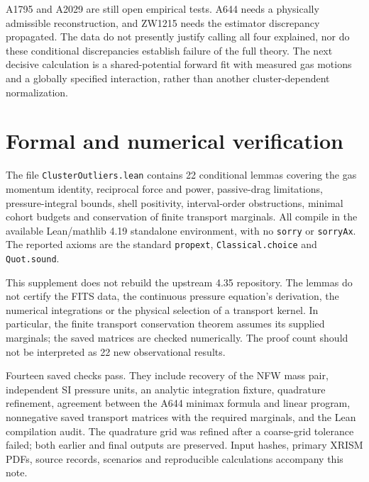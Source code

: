 \documentclass[11pt]{article}
\begin{document}
A1795 and A2029 are still open empirical tests. A644 needs a physically admissible reconstruction, and ZW1215 needs the estimator discrepancy propagated. The data do not presently justify calling all four explained, nor do these conditional discrepancies establish failure of the full theory. The next decisive calculation is a shared-potential forward fit with measured gas motions and a globally specified interaction, rather than another cluster-dependent normalization.

\clearpage
\section{Formal and numerical verification}
The file \texttt{ClusterOutliers.lean} contains 22 conditional lemmas covering the gas momentum identity, reciprocal force and power, passive-drag limitations, pressure-integral bounds, shell positivity, interval-order obstructions, minimal cohort budgets and conservation of finite transport marginals. All compile in the available Lean/mathlib 4.19 standalone environment, with no \texttt{sorry} or \texttt{sorryAx}. The reported axioms are the standard \texttt{propext}, \texttt{Classical.choice} and \texttt{Quot.sound}.

This supplement does not rebuild the upstream 4.35 repository. The lemmas do not certify the FITS data, the continuous pressure equation's derivation, the numerical integrations or the physical selection of a transport kernel. In particular, the finite transport conservation theorem assumes its supplied marginals; the saved matrices are checked numerically. The proof count should not be interpreted as 22 new observational results.

Fourteen saved checks pass. They include recovery of the NFW mass pair, independent SI pressure units, an analytic integration fixture, quadrature refinement, agreement between the A644 minimax formula and linear program, nonnegative saved transport matrices with the required marginals, and the Lean compilation audit. The quadrature grid was refined after a coarse-grid tolerance failed; both earlier and final outputs are preserved. Input hashes, primary XRISM PDFs, source records, scenarios and reproducible calculations accompany this note.
\end{document}
